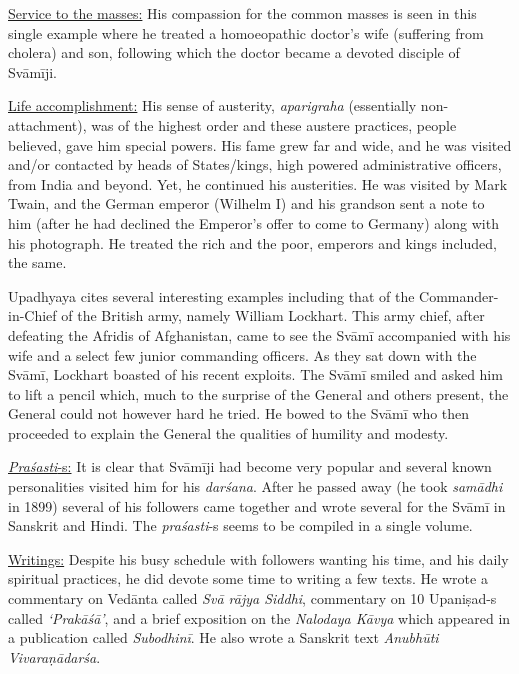 \begin{enumerate}
 \underline{Service to the masses:} His compassion for the common masses is seen in this single example where he treated a homoeopathic doctor’s wife (suffering from cholera) and son, following which the doctor became a devoted disciple of Svāmīji.

 \underline{Life accomplishment:} His sense of austerity, \textit{aparigraha} (essentially non-attachment), was of the highest order and these austere practices, people believed, gave him special powers. His fame grew far and wide, and he was visited and/or contacted by heads of States/kings, high powered administrative officers, from India and beyond. Yet, he continued his austerities. He was visited by Mark Twain, and the German emperor (Wilhelm I) and his grandson sent a note to him (after he had declined the Emperor’s offer to come to Germany) along with his photograph. He treated the rich and the poor, emperors and kings included, the same.

 Upadhyaya cites several interesting examples including that of the Commander-in-Chief of the British army, namely William Lockhart. This army chief, after defeating the Afridis of Afghanistan, came to see the Svāmī accompanied with his wife and a select few junior commanding officers. As they sat down with the Svāmī, Lockhart boasted of his recent exploits. The Svāmī smiled and asked him to lift a pencil which, much to the surprise of the General and others present, the General could not however hard he tried. He bowed to the Svāmī who then proceeded to explain the General the qualities of humility and modesty.

 \underline{\textit{Praśasti}-s:} It is clear that Svāmīji had become very popular and several known personalities visited him for his \textit{darśana}. After he passed away (he took \textit{samādhi} in 1899) several of his followers came together and wrote several for the Svāmī in Sanskrit and Hindi. The \textit{praśasti}-s seems to be compiled in a single volume.

 \underline{Writings:} Despite his busy schedule with followers wanting his time, and his daily spiritual practices, he did devote some time to writing a few texts. He wrote a commentary on Vedānta called \textit{Svā rājya Siddhi}, commentary on 10 Upaniṣad-s called \textit{‘Prakāśā’}, and a brief exposition on the \textit{Nalodaya Kāvya} which appeared in a publication called \textit{Subodhinī}. He also wrote a Sanskrit text \textit{Anubhūti Vivaraṇādarśa}.


\end{enumerate}
